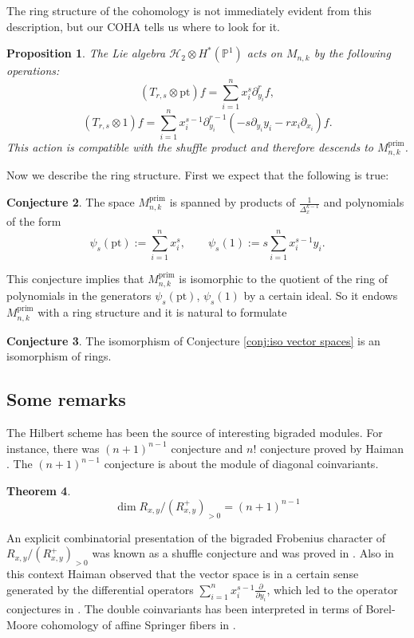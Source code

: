 \documentclass[12pt]{amsart}
\newtheorem{theorem}{Theorem}[section]
\newtheorem{prop}[theorem]{Proposition}
\theoremstyle{definition}
\newtheorem{conjecture}[theorem]{Conjecture}
\theoremstyle{remark}
\numberwithin{equation}{section}
\newcommand{\BP}{\mathbb P}
\begin{document}
	The ring structure of the cohomology is not immediately evident from this description, but our COHA tells us where to look for it. 
	\begin{prop}
		The Lie algebra $\mathscr{H}_2 \otimes H^*(\BP^1)$ acts on $M_{n,k}$ by the following operations:
		\[
		(T_{r,s}\otimes \mathrm{pt}) f  = \sum_{i=1}^n x_i^{s} \partial_{y_i}^r f,
		\]
		\[
		(T_{r,s}\otimes 1) f  = \sum_{i=1}^n x_i^{s-1} \partial_{y_i}^{r-1} (-s \partial_{y_i} y_i - r x_i \partial_{x_i}) f.
		\]
		This action is compatible with the shuffle product and therefore descends to $M_{n,k}^\textrm{prim}$.
	\end{prop}
	
	Now we describe the ring structure. First we expect that the following is true:
	\begin{conjecture}
		The space $M_{n,k}^\textrm{prim}$ is spanned by products of $\frac{1}{\Delta_x^{k-1}}$ and polynomials of the form
		\[
		\psi_s(\mathrm{pt}) := \sum_{i=1}^n x_i^s, \qquad \psi_s(1) := s \sum_{i=1}^n x_i^{s-1} y_i.
		\]
	\end{conjecture}
	This conjecture implies that $M_{n,k}^\textrm{prim}$ is isomorphic to the quotient of the ring of polynomials in the generators $\psi_s(\mathrm{pt})$, $\psi_s(1)$ by a certain ideal. So it endows $M_{n,k}^\textrm{prim}$ with a ring structure and it is natural to formulate
	
	\begin{conjecture}\label{conj:iso rings}
		The isomorphism of Conjecture \ref{conj:iso vector spaces} is an isomorphism of rings.
	\end{conjecture}
	
	\subsection{Some remarks}
	
	The Hilbert scheme has been the source of interesting bigraded modules. For instance, there was $(n+1)^{n-1}$ conjecture and $n!$ conjecture proved by Haiman \cite{haiman2002vanishing}. The $(n+1)^{n-1}$ conjecture is about the module of diagonal coinvariants.
	\begin{theorem}\cite{haiman2002vanishing}
		\[
		\dim R_{x,y}/(R_{x,y}^+)_{>0} = (n+1)^{n-1}
		\]
	\end{theorem}
	An explicit combinatorial presentation of the bigraded Frobenius character of $R_{x,y}/(R_{x,y}^+)_{>0}$ was known as a shuffle conjecture \cite{haglund2005combinatoriala} and was proved in \cite{carlsson2018proof}. Also in this context Haiman observed that the vector space is in a certain sense generated by the differential operators $\sum_{i=1}^n x_i^{s-1} \frac{\partial}{\partial y_i}$, which led to the operator conjectures in \cite{haiman1994conjectures}. The double coinvariants has been interpreted in terms of Borel-Moore cohomology of affine Springer fibers in \cite{carlsson2018affine}.
	
\end{document}
